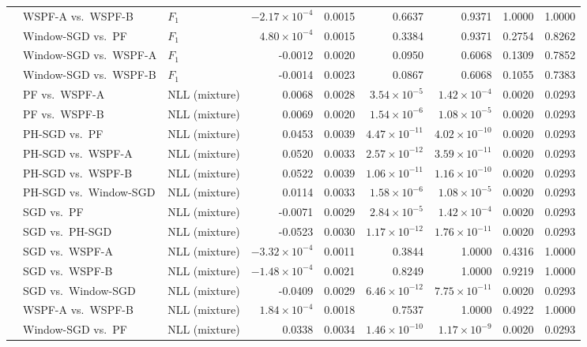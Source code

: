{\begin{longtable}{@{}lllrrrrrr@{}}
 & WSPF-A vs.\ WSPF-B & $F_1$ & $-2.17\times 10^{-4}$ & 0.0015 & 0.6637 & 0.9371 & 1.0000 & 1.0000 \\
 & Window-SGD vs.\ PF & $F_1$ & $4.80\times 10^{-4}$ & 0.0015 & 0.3384 & 0.9371 & 0.2754 & 0.8262 \\
 & Window-SGD vs.\ WSPF-A & $F_1$ & -0.0012 & 0.0020 & 0.0950 & 0.6068 & 0.1309 & 0.7852 \\
 & Window-SGD vs.\ WSPF-B & $F_1$ & -0.0014 & 0.0023 & 0.0867 & 0.6068 & 0.1055 & 0.7383 \\
 & PF vs.\ WSPF-A & NLL (mixture) & 0.0068 & 0.0028 & $3.54\times 10^{-5}$ & $1.42\times 10^{-4}$ & 0.0020 & 0.0293 \\
 & PF vs.\ WSPF-B & NLL (mixture) & 0.0069 & 0.0020 & $1.54\times 10^{-6}$ & $1.08\times 10^{-5}$ & 0.0020 & 0.0293 \\
 & PH-SGD vs.\ PF & NLL (mixture) & 0.0453 & 0.0039 & $4.47\times 10^{-11}$ & $4.02\times 10^{-10}$ & 0.0020 & 0.0293 \\
 & PH-SGD vs.\ WSPF-A & NLL (mixture) & 0.0520 & 0.0033 & $2.57\times 10^{-12}$ & $3.59\times 10^{-11}$ & 0.0020 & 0.0293 \\
 & PH-SGD vs.\ WSPF-B & NLL (mixture) & 0.0522 & 0.0039 & $1.06\times 10^{-11}$ & $1.16\times 10^{-10}$ & 0.0020 & 0.0293 \\
 & PH-SGD vs.\ Window-SGD & NLL (mixture) & 0.0114 & 0.0033 & $1.58\times 10^{-6}$ & $1.08\times 10^{-5}$ & 0.0020 & 0.0293 \\
 & SGD vs.\ PF & NLL (mixture) & -0.0071 & 0.0029 & $2.84\times 10^{-5}$ & $1.42\times 10^{-4}$ & 0.0020 & 0.0293 \\
 & SGD vs.\ PH-SGD & NLL (mixture) & -0.0523 & 0.0030 & $1.17\times 10^{-12}$ & $1.76\times 10^{-11}$ & 0.0020 & 0.0293 \\
 & SGD vs.\ WSPF-A & NLL (mixture) & $-3.32\times 10^{-4}$ & 0.0011 & 0.3844 & 1.0000 & 0.4316 & 1.0000 \\
 & SGD vs.\ WSPF-B & NLL (mixture) & $-1.48\times 10^{-4}$ & 0.0021 & 0.8249 & 1.0000 & 0.9219 & 1.0000 \\
 & SGD vs.\ Window-SGD & NLL (mixture) & -0.0409 & 0.0029 & $6.46\times 10^{-12}$ & $7.75\times 10^{-11}$ & 0.0020 & 0.0293 \\
 & WSPF-A vs.\ WSPF-B & NLL (mixture) & $1.84\times 10^{-4}$ & 0.0018 & 0.7537 & 1.0000 & 0.4922 & 1.0000 \\
 & Window-SGD vs.\ PF & NLL (mixture) & 0.0338 & 0.0034 & $1.46\times 10^{-10}$ & $1.17\times 10^{-9}$ & 0.0020 & 0.0293 \\

\end{longtable}}
